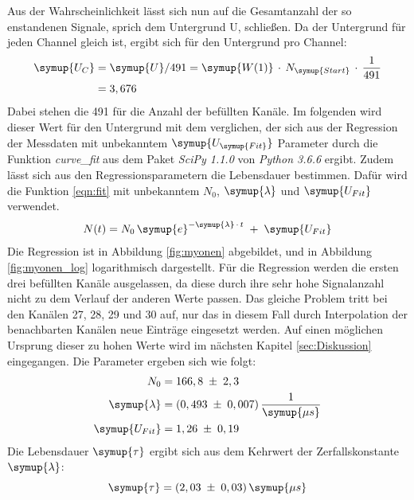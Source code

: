 Aus der Wahrscheinlichkeit lässt sich nun auf die Gesamtanzahl der so enstandenen
Signale, sprich dem Untergrund U, schließen. Da der Untergrund für jeden Channel gleich ist,
ergibt sich für den Untergrund pro Channel:
\begin{align*}
  \symup{U_{C}} &= \symup{U}/491 = \symup{W(1)}\,\cdot\,N_{\symup{Start}}\,\cdot\,\frac{1}{491}\\
                &= 3,676
\end{align*}
Dabei stehen die 491 für die Anzahl der befüllten Kanäle.
Im folgenden wird dieser Wert für den Untergrund mit dem verglichen, der sich aus der Regression
der Messdaten mit unbekanntem $\symup{U_{\symup{Fit}}}$ Parameter durch die Funktion \textit{curve\_fit} aus dem Paket
\textit{SciPy 1.1.0} von \textit{Python 3.6.6} ergibt. Zudem lässt sich aus den Regressionsparametern die Lebensdauer bestimmen.
Dafür wird die Funktion \ref{eqn:fit} mit unbekanntem $N_{0}$, $\symup{\lambda}$ und $\symup{U_{Fit}}$ verwendet.
\begin{equation}
  N(t) = N_0\, \symup{e}^{-\symup{\lambda}\,\cdot\,t}\;+\;\symup{U_{Fit}}
  \label{eqn:fit}
\end{equation}
Die Regression ist in Abbildung \ref{fig:myonen} abgebildet, und in Abbildung \ref{fig:myonen_log} logarithmisch dargestellt.
Für die Regression werden die ersten drei befüllten Kanäle ausgelassen, da diese durch ihre sehr hohe Signalanzahl nicht zu dem Verlauf
der anderen Werte passen. Das gleiche Problem tritt bei den Kanälen 27, 28, 29 und 30 auf, nur das in diesem Fall durch Interpolation der benachbarten
Kanälen neue Einträge eingesetzt werden. Auf einen möglichen Ursprung dieser zu hohen Werte wird im nächsten Kapitel \ref{sec:Diskussion} eingegangen.
Die Parameter ergeben sich wie folgt:
\begin{align*}
  N_0 &= 166,8\;\pm\;2,3\\
  \symup{\lambda} &= (0,493\;\pm\;0,007)\,\frac{1}{\symup{\mu s}}\\
  \symup{U_{Fit}} &= 1,26\;\pm\;0,19
\end{align*}
Die Lebensdauer $\symup{\tau}$ ergibt sich aus dem Kehrwert der Zerfallskonstante $\symup{\lambda}$:
\begin{equation*}
  \symup{\tau} = (2,03\;\pm\;0,03)\,\symup{\mu s}
\end{equation*}

